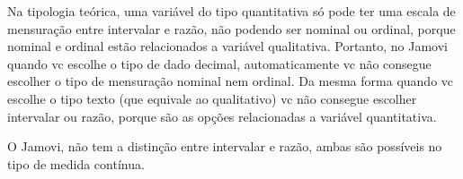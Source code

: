 Na tipologia teórica, uma variável do tipo quantitativa só pode ter uma escala de mensuração entre intervalar e razão, não podendo ser nominal ou ordinal, porque nominal e ordinal estão relacionados a variável qualitativa. Portanto, no Jamovi quando vc escolhe o tipo de dado decimal, automaticamente vc não consegue escolher o tipo de mensuração nominal nem ordinal. Da mesma forma quando vc escolhe o tipo texto (que equivale ao qualitativo) vc não consegue escolher intervalar ou razão, porque são as opções relacionadas a variável quantitativa.

O Jamovi, não tem a distinção entre intervalar e razão, ambas são possíveis no tipo de medida contínua.